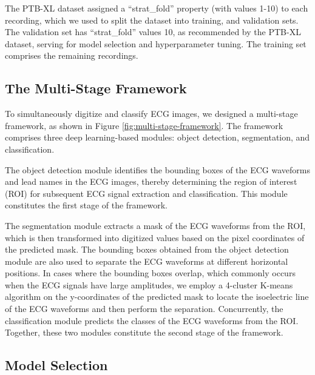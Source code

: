 The PTB-XL dataset assigned a ``strat\_fold'' property (with values 1-10) to each recording, which we used to split the dataset into training, and validation sets. The validation set has ``strat\_fold'' values 10, as recommended by the PTB-XL dataset, serving for model selection and hyperparameter tuning. The training set comprises the remaining recordings.

\subsection{The Multi-Stage Framework}
\label{subsec:multi_stage_framework}


To simultaneously digitize and classify ECG images, we designed a multi-stage framework, as shown in Figure \ref{fig:multi-stage-framework}. The framework comprises three deep learning-based modules: object detection, segmentation, and classification.

The object detection module identifies the bounding boxes of the ECG waveforms and lead names in the ECG images, thereby determining the region of interest (ROI) for subsequent ECG signal extraction and classification. This module constitutes the first stage of the framework.

The segmentation module extracts a mask of the ECG waveforms from the ROI, which is then transformed into digitized values based on the pixel coordinates of the predicted mask. The bounding boxes obtained from the object detection module are also used to separate the ECG waveforms at different horizontal positions. In cases where the bounding boxes overlap, which commonly occurs when the ECG signals have large amplitudes, we employ a 4-cluster K-means algorithm on the y-coordinates of the predicted mask to locate the isoelectric line of the ECG waveforms and then perform the separation. Concurrently, the classification module predicts the classes of the ECG waveforms from the ROI. Together, these two modules constitute the second stage of the framework.

\subsection{Model Selection}
\label{subsec:model_selection}


